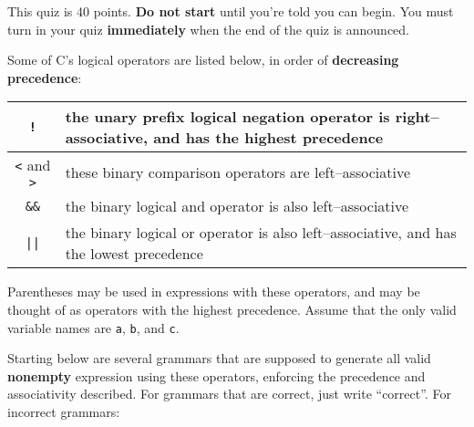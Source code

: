 \documentclass[11pt]{article}
\begin{document}
  \hspace{\fill}%
  \nameblock

  \smallskip


  \vspace{-3mm}

    \noindent
    This quiz is 40 points.  \textbf{Do not start} until you're told you can
  begin.  You must turn in your quiz \textbf{immediately} when the end of
  the quiz is announced.

    \medskip

    Some of C's logical operators are listed below, in order of
  \textbf{decreasing precedence}:

    \vspace{-3.5mm}

    \begin{center}

      \begin{tabular}[t]{|c|l|}

        \hline

        \texttt{!}
          & the unary prefix logical negation operator is
            right--associative, and has the highest precedence
          \\ \hline

        \texttt{<} and \texttt{>}
          & these binary comparison operators are left--associative
          \\ \hline

        \texttt{\&\&}
          & the binary logical and operator is also left--associative
          \\ \hline

        \texttt{||}
          & the binary logical or operator is also left--associative, and
            has the lowest precedence
          \\ \hline

      \end{tabular}

    \end{center}

    Parentheses may be used in expressions with these operators, and may be
  thought of as operators with the highest precedence.  Assume that the only
  valid variable names are \texttt{a}, \texttt{b}, and \texttt{c}.

    Starting below are several grammars that are supposed to generate all
  valid \textbf{nonempty} expression using these operators, enforcing the
  precedence and associativity described.  For grammars that are correct,
  just write ``correct''.  For incorrect grammars:
\end{document}
